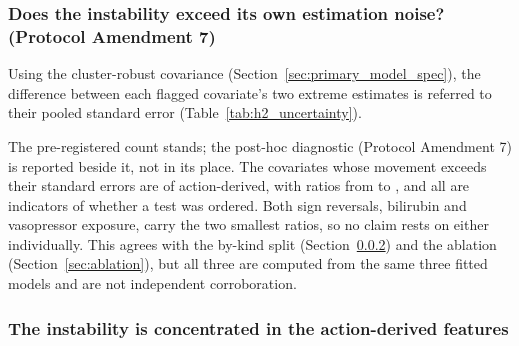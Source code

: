 \subsubsection{Does the instability exceed its own estimation noise? (Protocol
Amendment 7)}
\label{sec:h2_uncertainty}

Using the cluster-robust covariance (Section~\ref{sec:primary_model_spec}),
the difference between each flagged covariate's two extreme estimates is
referred to their pooled standard error (Table~\ref{tab:h2_uncertainty}).

\begin{table}[H]
    \centering\footnotesize\setlength{\tabcolsep}{4pt}
    \caption[H2 instability against estimation noise]{Each covariate flagged by
    H2, with its coefficient under each label variant, the difference between
    the two extremes, the pooled cluster-robust standard error of those two
    estimates, and their ratio. \pcHTwoNRobust{} of the \pcHTwoNFlagged{}
    flagged covariates move by more than roughly twice their pooled standard
    error; the remaining \pcHTwoNNoise{} move by less, the largest such ratio
    being \pcHTwoZMaxNoise; no covariate falls between \pcHTwoZMaxNoise{} and
    \pcHTwoZMinRobust. ``Kind'' marks clinician action or patient physiology
    (Section~\ref{sec:h2_action}). \textbf{A diagnostic, not a test}: the fits
    share stays, and the covariance is that of the penalised estimator
    (Section~\ref{sec:primary_model_spec}).}
    \label{tab:h2_uncertainty}
\end{table}

The pre-registered count stands; the post-hoc diagnostic (Protocol
Amendment 7) is reported beside it, not in its place. The covariates whose
movement exceeds their standard errors are \pcHTwoNRobustAction{} of
\pcHTwoNRobust{} action-derived, with ratios from \pcHTwoZMinRobust{} to
\pcHTwoZMax, and all are indicators of whether a test was ordered. Both sign
reversals, bilirubin and vasopressor exposure, carry the two smallest ratios,
so no claim rests on either individually. This agrees with the by-kind split
(Section~\ref{sec:h2_action}) and the ablation (Section~\ref{sec:ablation}),
but all three are computed from the same three fitted models and are not
independent corroboration.

\subsubsection{The instability is concentrated in the action-derived features}
\label{sec:h2_action}

